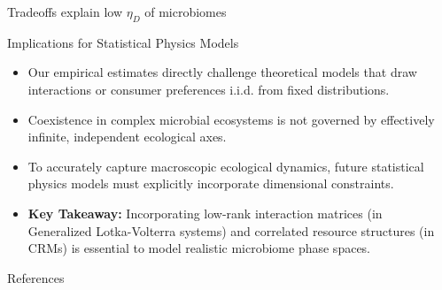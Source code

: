 \documentclass[final]{beamer}
\newlength{\sepwidth}
\newlength{\colwidth}
\newcommand{\separatorcolumn}{\begin{column}{\sepwidth}\end{column}}
\begin{document}
\begin{frame}[t]
\begin{columns}[t]
\begin{column}{\colwidth}
\begin{block}{Tradeoffs explain low $\eta_D$ of microbiomes}
  \end{block}
    


  \begin{block}{Implications for Statistical Physics Models}
    \begin{itemize}
         \item Our empirical estimates directly challenge theoretical models that draw interactions or consumer preferences i.i.d. from fixed distributions.
         \vspace{5pt}
         \item Coexistence in complex microbial ecosystems is not governed by effectively infinite, independent ecological axes.
         \vspace{5pt}
         \item To accurately capture macroscopic ecological dynamics, future statistical physics models must explicitly incorporate dimensional constraints.
         \vspace{5pt}
         \item \textbf{Key Takeaway:} Incorporating low-rank interaction matrices (in Generalized Lotka-Volterra systems) and correlated resource structures (in CRMs) is essential to model realistic microbiome phase spaces.
     \end{itemize}
    
  \end{block}
    \vspace{-10pt}
  \begin{block}{References}
    \nocite{*}
    \footnotesize{}

  \end{block}

\end{column}

\separatorcolumn
\end{columns}
\end{frame}
\end{document}
